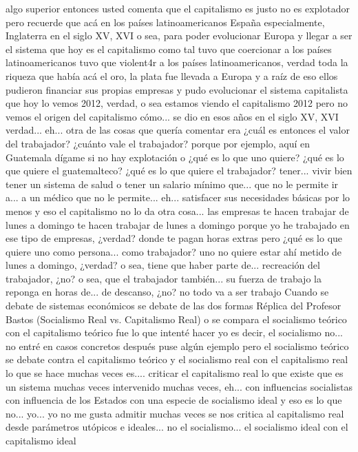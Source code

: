 algo superior entonces usted comenta que el capitalismo es justo no es explotador
pero recuerde que acá en los países latinoamericanos España especialmente, Inglaterra
en el siglo XV, XVI o sea, para poder evolucionar Europa y llegar a ser
el sistema que hoy es el capitalismo como tal tuvo que coercionar a los países latinoamericanos
tuvo que violent4r a los países latinoamericanos, verdad toda la riqueza que había acá
el oro, la plata fue llevada a Europa y a raíz de eso ellos pudieron financiar sus propias empresas
y pudo evolucionar el sistema capitalista que hoy lo vemos 2012, verdad, o sea
estamos viendo el capitalismo 2012 pero no vemos el origen del capitalismo cómo...
se dio en esos años en el siglo XV, XVI verdad... eh... otra de las cosas que quería comentar era
¿cuál es entonces el valor del trabajador? ¿cuánto vale el trabajador? porque por ejemplo, aquí en Guatemala
dígame si no hay explotación o ¿qué es lo que uno quiere? ¿qué es lo que quiere el guatemalteco? ¿qué es lo que quiere el trabajador?
tener... vivir bien tener un sistema de salud
o tener un salario mínimo que... que no le permite ir a... a un médico
que no le permite... eh... satisfacer sus necesidades básicas por lo menos
y eso el capitalismo no lo da otra cosa... las empresas
te hacen trabajar de lunes a domingo te hacen trabajar de lunes a domingo
porque yo he trabajado en ese tipo de empresas, ¿verdad? donde te pagan horas extras
pero ¿qué es lo que quiere uno como persona... como trabajador? uno no quiere estar ahí metido de lunes a domingo, ¿verdad?
o sea, tiene que haber parte de... recreación del trabajador, ¿no? o sea, que el trabajador también...
su fuerza de trabajo la reponga en horas de... de descanso, ¿no?
no todo va a ser trabajo Cuando se debate de sistemas económicos se debate de las dos formas
Réplica del Profesor Bastos (Socialismo Real vs. Capitalismo Real)
o se compara el socialismo teórico con el capitalismo teórico fue lo que intenté hacer yo es decir, el socialismo no... no entré en casos concretos
después puse algún ejemplo pero el socialismo teórico se debate contra el capitalismo teórico y el socialismo real con el capitalismo real
lo que se hace muchas veces es.... criticar el capitalismo real lo que existe que es un sistema
muchas veces intervenido muchas veces, eh... con influencias socialistas con influencia de los Estados
con una especie de socialismo ideal y eso es lo que no... yo... yo no me gusta admitir muchas veces se nos critica al capitalismo real
desde parámetros utópicos e ideales... no el socialismo... el socialismo ideal con el capitalismo ideal
